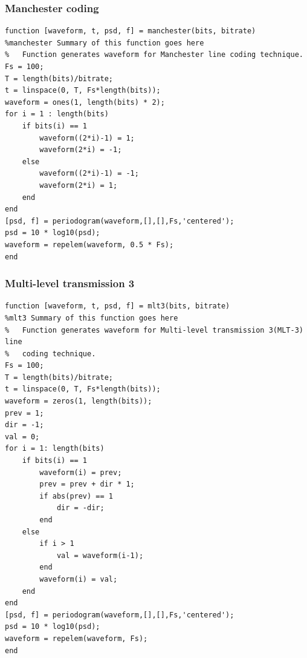 \documentclass[a4paper, 12pt, english]{article}
\begin{document}
\subsubsection{Manchester coding}
\begin{lstlisting}[style=matlab]
function [waveform, t, psd, f] = manchester(bits, bitrate)
%manchester Summary of this function goes here
%   Function generates waveform for Manchester line coding technique.
Fs = 100;
T = length(bits)/bitrate;
t = linspace(0, T, Fs*length(bits));
waveform = ones(1, length(bits) * 2);
for i = 1 : length(bits)
    if bits(i) == 1
        waveform((2*i)-1) = 1;
        waveform(2*i) = -1;
    else
        waveform((2*i)-1) = -1;
        waveform(2*i) = 1;
    end
end
[psd, f] = periodogram(waveform,[],[],Fs,'centered');
psd = 10 * log10(psd);
waveform = repelem(waveform, 0.5 * Fs);
end
\end{lstlisting}

\subsubsection{Multi-level transmission 3}
\begin{lstlisting}[style=matlab]
function [waveform, t, psd, f] = mlt3(bits, bitrate)
%mlt3 Summary of this function goes here
%   Function generates waveform for Multi-level transmission 3(MLT-3) line 
%   coding technique.
Fs = 100;
T = length(bits)/bitrate;
t = linspace(0, T, Fs*length(bits));
waveform = zeros(1, length(bits));
prev = 1;
dir = -1;
val = 0;
for i = 1: length(bits)
    if bits(i) == 1
        waveform(i) = prev;
        prev = prev + dir * 1;
        if abs(prev) == 1
            dir = -dir;
        end
    else
        if i > 1
            val = waveform(i-1);
        end
        waveform(i) = val;
    end
end
[psd, f] = periodogram(waveform,[],[],Fs,'centered');
psd = 10 * log10(psd);
waveform = repelem(waveform, Fs);
end
\end{lstlisting}

\end{document}
